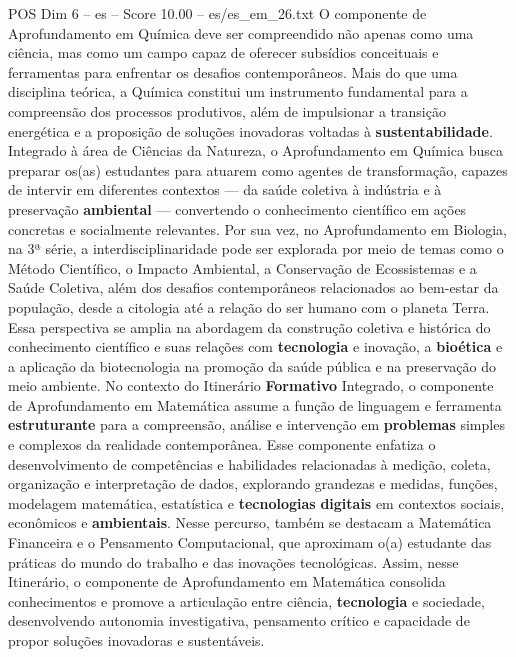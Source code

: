 \begin{textsample}{POS Dim 6 – es – Score 10.00 – es/es\_em\_26.txt}
O componente de Aprofundamento em Química deve ser compreendido não apenas como uma ciência, mas como um campo capaz de oferecer subsídios conceituais e ferramentas para enfrentar os desafios contemporâneos.
Mais do que uma disciplina teórica, a Química constitui um instrumento fundamental para a compreensão dos processos produtivos, além de impulsionar a transição energética e a proposição de soluções inovadoras voltadas à \textbf{sustentabilidade}.
Integrado à área de Ciências da Natureza, o Aprofundamento em Química busca preparar os(as) estudantes para atuarem como agentes de transformação, capazes de intervir em diferentes contextos — da saúde coletiva à indústria e à preservação \textbf{ambiental} — convertendo o conhecimento científico em ações concretas e socialmente relevantes.
Por sua vez, no Aprofundamento em Biologia, na 3ª série, a interdisciplinaridade pode ser explorada por meio de temas como o Método Científico, o Impacto Ambiental, a Conservação de Ecossistemas e a Saúde Coletiva, além dos desafios contemporâneos relacionados ao bem-estar da população, desde a citologia até a relação do ser humano com o planeta Terra.
Essa perspectiva se amplia na abordagem da construção coletiva e histórica do conhecimento científico e suas relações com \textbf{tecnologia} e inovação, a \textbf{bioética} e a aplicação da biotecnologia na promoção da saúde pública e na preservação do meio ambiente.
No contexto do Itinerário \textbf{Formativo} Integrado, o componente de Aprofundamento em Matemática assume a função de linguagem e ferramenta \textbf{estruturante} para a compreensão, análise e intervenção em \textbf{problemas} simples e complexos da realidade contemporânea.
Esse componente enfatiza o desenvolvimento de competências e habilidades relacionadas à medição, coleta, organização e interpretação de dados, explorando grandezas e medidas, funções, modelagem matemática, estatística e \textbf{tecnologias} \textbf{digitais} em contextos sociais, econômicos e \textbf{ambientais}.
Nesse percurso, também se destacam a Matemática Financeira e o Pensamento Computacional, que aproximam o(a) estudante das práticas do mundo do trabalho e das inovações tecnológicas.
Assim, nesse Itinerário, o componente de Aprofundamento em Matemática consolida conhecimentos e promove a articulação entre ciência, \textbf{tecnologia} e sociedade, desenvolvendo autonomia investigativa, pensamento crítico e capacidade de propor soluções inovadoras e sustentáveis.

\end{textsample}
